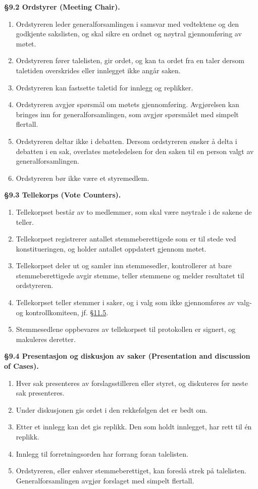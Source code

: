 \documentclass{../../../Common/Latex/Templates/rapport}
\begin{document}
\textbf{\S 9.2 Ordstyrer (Meeting Chair).}\label{bylaw:9.2}
\begin{enumerate}
  \item Ordstyreren leder generalforsamlingen i samsvar med vedtektene og den godkjente sakslisten, og skal sikre en ordnet og nøytral gjennomføring av møtet.
  \item Ordstyreren fører talelisten, gir ordet, og kan ta ordet fra en taler dersom taletiden overskrides eller innlegget ikke angår saken.
  \item Ordstyreren kan fastsette taletid for innlegg og replikker.
  \item Ordstyreren avgjør spørsmål om møtets gjennomføring. Avgjørelsen kan bringes inn for generalforsamlingen, som avgjør spørsmålet med simpelt flertall.
  \item Ordstyreren deltar ikke i debatten. Dersom ordstyreren ønsker å delta i debatten i en sak, overlates møteledelsen for den saken til en person valgt av generalforsamlingen.
  \item Ordstyreren bør ikke være et styremedlem.
\end{enumerate}

\textbf{\S 9.3 Tellekorps (Vote Counters).}\label{bylaw:9.3}
\begin{enumerate}
  \item Tellekorpset består av to medlemmer, som skal være nøytrale i de sakene de teller.
  \item Tellekorpset registrerer antallet stemmeberettigede som er til stede ved konstitueringen, og holder antallet oppdatert gjennom møtet.
  \item Tellekorpset deler ut og samler inn stemmesedler, kontrollerer at bare stemmeberettigede avgir stemme, teller stemmene og melder resultatet til ordstyreren.
  \item Tellekorpset teller stemmer i saker, og i valg som ikke gjennomføres av valg- og kontrollkomiteen, jf. \hyperref[bylaw:11.5]{\S 11.5}.
  \item Stemmesedlene oppbevares av tellekorpset til protokollen er signert, og makuleres deretter.
\end{enumerate}

\textbf{\S 9.4 Presentasjon og diskusjon av saker (Presentation and discussion of Cases).}\label{bylaw:9.4}
\begin{enumerate}
  \item Hver sak presenteres av forslagsstilleren eller styret, og diskuteres før neste sak presenteres.
  \item Under diskusjonen gis ordet i den rekkefølgen det er bedt om.
  \item Etter et innlegg kan det gis replikk. Den som holdt innlegget, har rett til én replikk.
  \item Innlegg til forretningsorden har forrang foran talelisten.
  \item Ordstyreren, eller enhver stemmeberettiget, kan foreslå strek på talelisten. Generalforsamlingen avgjør forslaget med simpelt flertall.
\end{enumerate}
\end{document}
